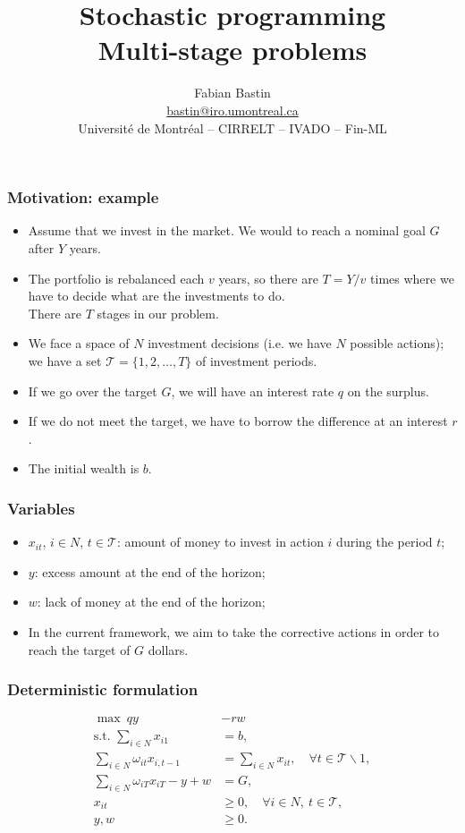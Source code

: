 \documentclass{beamer}
\title[Multi-stage problems]{Stochastic programming\\Multi-stage problems}
\author[Fabian Bastin]{Fabian Bastin \\ \url{bastin@iro.umontreal.ca} \\ Université de Montréal -- CIRRELT -- IVADO -- Fin-ML}
\date{}
\begin{document}
\frame{\titlepage}

\begin{frame}
\frametitle{Motivation: example}

\begin{itemize}
\item
Assume that we invest in the market.
We would to reach a nominal goal $G$ after $Y$ years.
\item
The portfolio is rebalanced each $v$ years, so there are $T = Y/v$ times where we have to decide what are the investments to do.\\
There are $T$ stages in our problem.
\item
We face a space of $N$ investment decisions (i.e. we have $N$ possible actions); we have a set $\mathcal{T} = \lbrace 1, 2,\ldots, T \rbrace$ of investment periods.
\item
If we go over the target $G$, we will have an interest rate $q$ on the surplus.
\item
If we do not meet the target, we have to borrow the difference at an interest $r$.
\item
The initial wealth is $b$.
\end{itemize}

\end{frame}

\begin{frame}
\frametitle{Variables}

\begin{itemize}
\item
$x_{it}$, $i \in N$, $t \in \mathcal{T}$: amount of money to invest in action $i$ during the period $t$;
\item
$y$: excess amount at the end of the horizon;
\item
$w$: lack of money at the end of the horizon;
\item
In the current framework, we aim to take the corrective actions in order to reach the target of $G$ dollars.
\end{itemize}

\end{frame}

\begin{frame}
\frametitle{Deterministic formulation}

\begin{align*}
\max\ qy & - rw\\
\mbox{s.t. } \sum_{i \in N} x_{i1} & = b,\\
\sum_{i \in N} \omega_{it}x_{i,t-1} & = \sum_{i \in N} x_{it}, \quad
\forall t \in \mathcal{T} \backslash 1, \\
\sum_{i \in N} \omega_{iT}x_{iT} - y + w & = G,\\
x_{it} & \geq 0, \quad \forall i \in N,\ t \in \mathcal{T}, \\
y, w & \geq 0.
\end{align*}

\end{frame}
\end{document}
